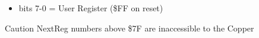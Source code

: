 \begin{itemize}
\item bits 7-0 = User Register (\$FF on reset)
\end{itemize}

Caution NextReg numbers above \$7F are inaccessible to the Copper

